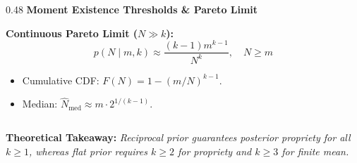 \documentclass[aspectratio=169,10pt]{beamer}
\begin{document}
\begin{frame}[c]
\begin{columns}[t,onlytextwidth]
    \begin{column}{0.48\textwidth}
      {\small \textbf{\color{accentblue} Moment Existence Thresholds \& Pareto Limit}}\\[0.08cm]
      {\scriptsize
      \begin{center}
      \end{center}
      \vspace{0.08cm}
      \textbf{Continuous Pareto Limit ($N \gg k$):}
      \begin{equation*}
        p(N \mid m, k) \approx \frac{(k-1) m^{k-1}}{N^k}, \quad N \ge m
      \end{equation*}
      \begin{itemize}
        \setlength{\itemsep}{0.04cm}
        \item Cumulative CDF: $F(N) = 1 - (m/N)^{k-1}$.
        \item Median: $\widehat{N}_{\mathrm{med}} \approx m \cdot 2^{1/(k-1)}$.
      \end{itemize}}
    \end{column}
  \end{columns}
  
  \vspace{0.20cm}
  \begin{center}
    {\footnotesize \textbf{\color{headernavy} Theoretical Takeaway: } \textit{Reciprocal prior guarantees posterior propriety for all $k \ge 1$, whereas flat prior requires $k \ge 2$ for propriety and $k \ge 3$ for finite mean.}}
  \end{center}
\end{frame}
\end{document}
